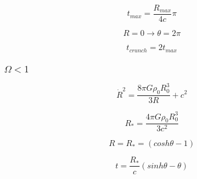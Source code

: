 \documentclass[a4paper, 12pt]{article} %
\begin{document}
\begin{equation}
t_{max} = \dfrac{R_{max}}{4c}\pi
\end{equation}

\begin{equation}
R = 0 \rightarrow \theta = 2\pi
\end{equation}

\begin{equation}
t_{crunch} = 2 t_{max}
\end{equation}

\subsubsection{$\Omega < 1$}


\begin{equation}
\dot{R}^2 = \dfrac{8\pi G \rho_0 R_0^3}{3R}+ c^2
\end{equation}

\begin{equation}
R_{*} = \dfrac{4 \pi G \rho_0 R_0^3}{3c^2}
\end{equation}

\begin{equation}
R = R_{*} = (cosh \theta - 1)
\end{equation}

\begin{equation}
t = \dfrac{R_{*}}{c}(sinh \theta - \theta)
\end{equation}
\end{document}
